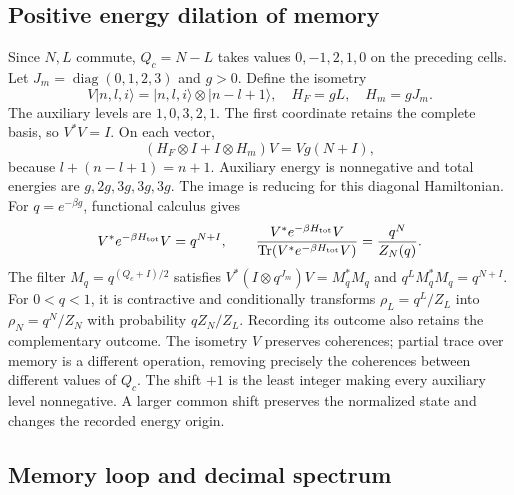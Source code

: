 \subsection{Positive energy dilation of memory}
\label{sec:ii-ter27-memoria}

Since $N,L$ commute, $Q_c=N-L$ takes values $0,-1,2,1,0$ on the
preceding cells. Let $J_m=\operatorname{diag}(0,1,2,3)$ and $g>0$.
Define the isometry
\begin{equation}
 V|n,l,i\rangle=|n,l,i\rangle\otimes|n-l+1\rangle,
 \quad H_F=gL,\quad H_m=gJ_m.
 \label{eq:ii-ter27-lift}
\end{equation}
The auxiliary levels are $1,0,3,2,1$. The first coordinate retains
the complete basis, so $V^*V=I$. On each vector,
\begin{equation}
 (H_F\otimes I+I\otimes H_m)V=Vg(N+I),
 \label{eq:ii-ter27-energia-memoria}
\end{equation}
because $l+(n-l+1)=n+1$. Auxiliary energy is nonnegative and total
energies are $g,2g,3g,3g,3g$. The image is reducing for this diagonal
Hamiltonian. For $q=e^{-\beta g}$, functional calculus gives
\[
 V^*e^{-\beta H_{\rm tot}}V=q^{N+I},\qquad
 \frac{V^*e^{-\beta H_{\rm tot}}V}
 {\operatorname{Tr}(V^*e^{-\beta H_{\rm tot}}V)}=\frac{q^N}{Z_N(q)}.
\]
The filter $M_q=q^{(Q_c+I)/2}$ satisfies
$V^*(I\otimes q^{J_m})V=M_q^*M_q$ and
$q^L M_q^*M_q=q^{N+I}$. For $0<q<1$, it is contractive and
conditionally transforms $\rho_L=q^L/Z_L$ into $\rho_N=q^N/Z_N$
with probability $qZ_N/Z_L$. Recording its outcome also retains the
complementary outcome. The isometry $V$ preserves coherences; partial
trace over memory is a different operation, removing precisely the
coherences between different values of $Q_c$.
The shift $+1$ is the least integer making every auxiliary level
nonnegative. A larger common shift preserves the normalized state and
changes the recorded energy origin.

\subsection{Memory loop and decimal spectrum}
\label{sec:ii-ter27-espectro}

